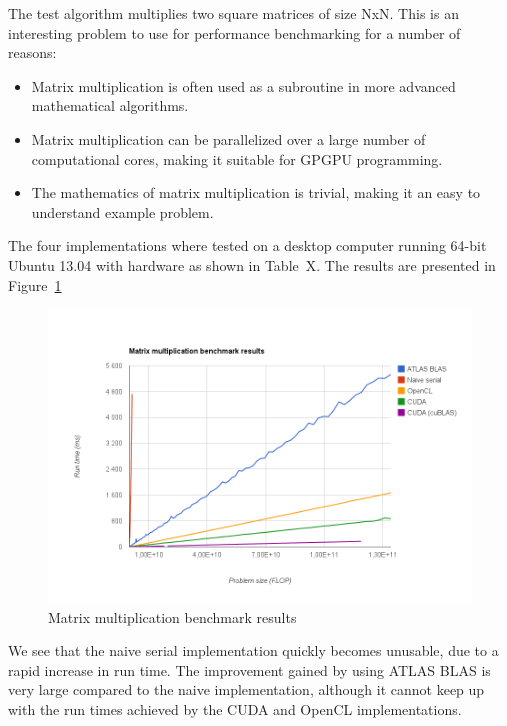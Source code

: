 The test algorithm multiplies two square matrices of size NxN. This is an interesting problem to use for performance benchmarking for a number of reasons:

\begin{itemize}
    \item Matrix multiplication is often used as a subroutine in more advanced mathematical algorithms.
    \item Matrix multiplication can be parallelized over a large number of computational cores, making it suitable for GPGPU programming.
    \item The mathematics of matrix multiplication is trivial, making it an easy to understand example problem.
\end{itemize}

The four implementations where tested on a desktop computer running 64-bit Ubuntu 13.04 with hardware as shown in Table~X. The results are presented in Figure~\ref{fig:matrix-multiplication-benchmark-results}

\begin{figure}[ht!]
    \centering
    \includegraphics[width=120mm]{../gfx/matrix-multiplication-benchmark-results.png}
    \caption{Matrix multiplication benchmark results}
    \label{fig:matrix-multiplication-benchmark-results}
\end{figure}

We see that the naive serial implementation quickly becomes unusable, due to a rapid increase in run time. The improvement gained by using ATLAS BLAS is very large compared to the naive implementation, although it cannot keep up with the run times achieved by the CUDA and OpenCL implementations.

